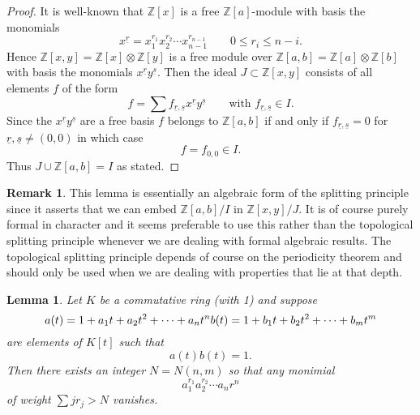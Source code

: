 \documentclass[leqno]{book}
\numberwithin{equation}{section}
\newtheorem{lemma}[theorem]{Lemma}
\theoremstyle{definition}
\newtheorem*{remark}{Remark}
\begin{document}
            \begin{proof}
              It is well-known that $\mathbb{Z}[x]$ is a free $\mathbb{Z}[a]$-module with basis the monomials
              \begin{equation*}
                x^{\underline{r}}=x_{1}^{r_1}x_{2}^{r_2}\cdots x_{n-1}^{r_{n-1}}\qquad 0\le r_{i}\le n-i.
              \end{equation*}
              Hence $\mathbb{Z}[x,y]=\mathbb{Z}[x]\otimes \mathbb{Z}[y]$ is a free module over $\mathbb{Z}[a,b]=\mathbb{Z}[a]\otimes \mathbb{Z}[b]$ with basis the monomials $x^{\underline{r}}y^{\underline{s}}$. Then the ideal $J \subset \mathbb{Z}[x,y]$ consists of all elements $f$ of the form
              \begin{equation*}
                f=\sum f_{\underline{r},\underline{s}}x^{\underline{r}}y^{\underline{s}}\qquad \text{with } f_{\underline{r},\underline{s}} \in I.
              \end{equation*}
              Since the $x^{\underline{r}}y^{\underline{s}}$ are a free basis $f$ belongs to $\mathbb{Z}[a,b]$ if and only if $f_{\underline{r},\underline{s}}=0$ for $\underline{r},\underline{s}\neq (0,0)$ in which case
              \begin{equation*}
                f=f_{0,0}\in I.
              \end{equation*}
              Thus $J\cup \mathbb{Z}[a,b]=I$ as stated.
            \end{proof}

            \begin{remark}
              This lemma is essentially an algebraic form of the splitting principle since it asserts that we can embed $\mathbb{Z}[a,b]/I$ in $\mathbb{Z}[x,y]/J$. It is of course purely formal in character and it seems preferable to use this rather than the topological splitting principle whenever we are dealing with formal algebraic results. The topological splitting principle depends of course on the periodicity theorem and should only be used when we are dealing with properties that lie at that depth.
            \end{remark}

            \begin{lemma}
              Let $K$ be a commutative ring (with 1) and suppose
              \begin{equation*}
                a(t)=1+a_1 t+a_2 t^{2}+ \cdots +a_{n}t ^{n} \\
                b(t)=1+b_1 t+b_2 t^{2}+ \cdots +b_{m}t ^{m}
              \end{equation*}
              are elements of $K[t]$ such that 
              \begin{equation*}
                a(t)b(t)=1.
              \end{equation*}
              Then there exists an integer $N=N(n,m)$ so that any monimial
              \begin{equation*}
                a_{1}^{r_1}a_{2}^{r_2}\cdots a_{n}r^{n}
              \end{equation*}
              of weight $\sum jr_{j}>N$ vanishes.
            \end{lemma}
\end{document}
